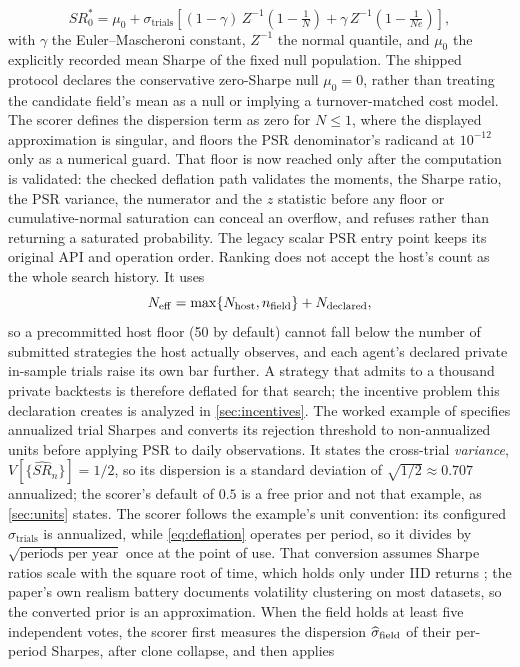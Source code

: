 \begin{equation}\label{eq:deflation}
SR^{*}_{0} = \mu_{0}+\sigma_{\text{trials}}\left[(1-\gamma)\,Z^{-1}\!\left(1-\tfrac{1}{N}\right) + \gamma\,Z^{-1}\!\left(1-\tfrac{1}{Ne}\right)\right],
\end{equation}
with $\gamma$ the Euler--Mascheroni constant, $Z^{-1}$ the normal quantile, and $\mu_0$ the explicitly recorded mean Sharpe of the fixed null population. The shipped protocol declares the conservative zero-Sharpe null $\mu_0=0$, rather than treating the candidate field's mean as a null or implying a turnover-matched cost model. The scorer defines the dispersion term as zero for $N\leq1$, where the displayed approximation is singular, and floors the PSR denominator's radicand at $10^{-12}$ only as a numerical guard. That floor is now reached only after the computation is validated: the checked deflation path validates the moments, the Sharpe ratio, the PSR variance, the numerator and the $z$ statistic before any floor or cumulative-normal saturation can conceal an overflow, and refuses rather than returning a saturated probability. The legacy scalar PSR entry point keeps its original API and operation order. Ranking does not accept the host's count as the whole search history. It uses
\begin{equation}\label{eq:effective-n}
N_{\rm eff}=\max\{N_{\rm host},n_{\rm field}\}+N_{\rm declared},
\end{equation}
so a precommitted host floor (50 by default) cannot fall below the number of submitted strategies the host actually observes, and each agent's declared private in-sample trials raise its own bar further. A strategy that admits to a thousand private backtests is therefore deflated for that search; the incentive problem this declaration creates is analyzed in \cref{sec:incentives}. The worked example of \citet[pp.~102--103]{bailey2014deflated} specifies annualized trial Sharpes and converts its rejection threshold to non-annualized units before applying PSR to daily observations. It states the cross-trial \emph{variance}, $V[\{\widehat{SR}_n\}]=1/2$, so its dispersion is a standard deviation of $\sqrt{1/2}\approx0.707$ annualized; the scorer's default of $0.5$ is a free prior and not that example, as \cref{sec:units} states. The scorer follows the example's unit convention: its configured $\sigma_{\text{trials}}$ is annualized, while \cref{eq:deflation} operates per period, so it divides by $\sqrt{\text{periods per year}}$ once at the point of use. That conversion assumes Sharpe ratios scale with the square root of time, which holds only under IID returns \citep{lo2002sharpe}; the paper's own realism battery documents volatility clustering on most datasets, so the converted prior is an approximation. When the field holds at least five independent votes, the scorer first measures the dispersion $\widehat\sigma_{\rm field}$ of their per-period Sharpes, after clone collapse, and then applies
